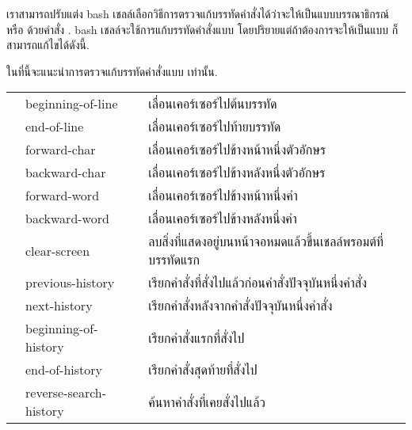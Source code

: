\begin{thwbr}
เราสามารถปรับแต่ง bash เชลล์เลือกวิธีการตรวจแก้บรรทัดคำสั่งได้ว่าจะให้เป็นแบบบรรณาธิกรณ์  หรือ  ด้วยคำสั่ง . bash เชลล์จะใช้การแก้บรรทัดคำสั่งแบบ  โดยปริยายแต่ถ้าต้องการจะให้เป็นแบบ  ก็สามารถแก้ไขได้ดังนี้.
\begin{MyExample}
\end{MyExample}%
ในที่นี้จะแนะนำการตรวจแก้บรรทัดคำสั่งแบบ  เท่านั้น.

\bigskip
{}\label{tab:lineedit}
\tablelasttail{\hline}
\begin{supertabular}{l|l|p{.5\linewidth}}
 & beginning-of-line & เลื่อนเคอร์เซอร์ไปต้นบรรทัด\\
 & end-of-line & เลื่อนเคอร์เซอร์ไปท้ายบรรทัด\\
 & forward-char & เลื่อนเคอร์เซอร์ไปข้างหน้าหนึ่งตัวอักษร\\
 & backward-char &เลื่อนเคอร์เซอร์ไปข้างหลังหนึ่งตัวอักษร\\
 & forward-word &เลื่อนเคอร์เซอร์ไปข้างหน้าหนึ่งคำ\\
 & backward-word & เลื่อนเคอร์เซอร์ไปข้างหลังหนึ่งคำ\\
 & clear-screen & ลบสิ่งที่แสดงอยู่บนหน้าจอหมดแล้วขึ้นเชลล์พรอมต์ที่บรรทัดแรก\\
 & previous-history & เรียกคำสั่งที่สั่งไปแล้วก่อนคำสั่งปัจจุบันหนึ่งคำสั่ง\\
 & next-history & เรียกคำสั่งหลังจากคำสั่งปัจจุบันหนึ่งคำสั่ง\\
 & beginning-of-history & เรียกคำสั่งแรกที่สั่งไป\\
 & end-of-history & เรียกคำสั่งสุดท้ายที่สั่งไป\\
 & reverse-search-history & ค้นหาคำสั่งที่เคยสั่งไปแล้ว\\

\end{supertabular}
\end{thwbr}
